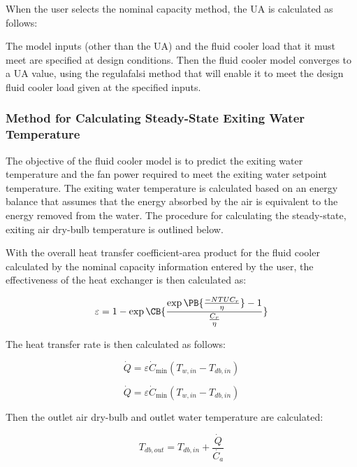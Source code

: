 When the user selects the nominal capacity method, the UA is calculated as follows:

The model inputs (other than the UA) and the fluid cooler load that it must meet are specified at design conditions. Then the fluid cooler model converges to a UA value, using the regulafalsi method that will enable it to meet the design fluid cooler load given at the specified inputs.

\subsubsection{Method for Calculating Steady-State Exiting Water Temperature}\label{method-for-calculating-steady-state-exiting-water-temperature-1}

The objective of the fluid cooler model is to predict the exiting water temperature and the fan power required to meet the exiting water setpoint temperature. The exiting water temperature is calculated based on an energy balance that assumes that the energy absorbed by the air is equivalent to the energy removed from the water. The procedure for calculating the steady-state, exiting air dry-bulb temperature is outlined below.

With the overall heat transfer coefficient-area product for the fluid cooler calculated by the nominal capacity information entered by the user, the effectiveness of the heat exchanger is then calculated as:

\begin{equation}
  \varepsilon = 1-\exp{\CB{ \frac{\exp{\PB{\frac{-NTU C_r}{\eta}}}-1}{\frac{C_{r}}{\eta}} }}
\end{equation}

The heat transfer rate is then calculated as follows:

\begin{equation}
\dot Q = \varepsilon {\dot C_{\min }}({T_{w,in}} - {T_{db,in}})
\end{equation}

\begin{equation}
\dot Q = \varepsilon {\dot C_{\min }}({T_{w,in}} - {T_{db,in}})
\end{equation}

Then the outlet air dry-bulb and outlet water temperature are calculated:

\begin{equation}
{T_{db,out}} = {T_{db,in}} + \frac{\dot{Q}}{\dot{C_a}}
\end{equation}

